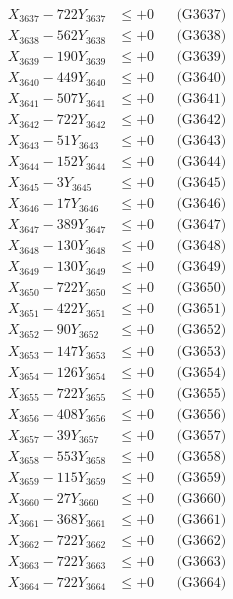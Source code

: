 \documentclass[a4paper,10pt]{article}
\begin{document}
{\begin{align}
X_{3637} - 722Y_{3637} &\leq +0 && \text{(G3637)} \\
X_{3638} - 562Y_{3638} &\leq +0 && \text{(G3638)} \\
X_{3639} - 190Y_{3639} &\leq +0 && \text{(G3639)} \\
X_{3640} - 449Y_{3640} &\leq +0 && \text{(G3640)} \\
\allowbreak
X_{3641} - 507Y_{3641} &\leq +0 && \text{(G3641)} \\
X_{3642} - 722Y_{3642} &\leq +0 && \text{(G3642)} \\
X_{3643} - 51Y_{3643} &\leq +0 && \text{(G3643)} \\
X_{3644} - 152Y_{3644} &\leq +0 && \text{(G3644)} \\
X_{3645} - 3Y_{3645} &\leq +0 && \text{(G3645)} \\
X_{3646} - 17Y_{3646} &\leq +0 && \text{(G3646)} \\
X_{3647} - 389Y_{3647} &\leq +0 && \text{(G3647)} \\
X_{3648} - 130Y_{3648} &\leq +0 && \text{(G3648)} \\
X_{3649} - 130Y_{3649} &\leq +0 && \text{(G3649)} \\
X_{3650} - 722Y_{3650} &\leq +0 && \text{(G3650)} \\
\allowbreak
X_{3651} - 422Y_{3651} &\leq +0 && \text{(G3651)} \\
X_{3652} - 90Y_{3652} &\leq +0 && \text{(G3652)} \\
X_{3653} - 147Y_{3653} &\leq +0 && \text{(G3653)} \\
X_{3654} - 126Y_{3654} &\leq +0 && \text{(G3654)} \\
X_{3655} - 722Y_{3655} &\leq +0 && \text{(G3655)} \\
X_{3656} - 408Y_{3656} &\leq +0 && \text{(G3656)} \\
X_{3657} - 39Y_{3657} &\leq +0 && \text{(G3657)} \\
X_{3658} - 553Y_{3658} &\leq +0 && \text{(G3658)} \\
X_{3659} - 115Y_{3659} &\leq +0 && \text{(G3659)} \\
X_{3660} - 27Y_{3660} &\leq +0 && \text{(G3660)} \\
\allowbreak
X_{3661} - 368Y_{3661} &\leq +0 && \text{(G3661)} \\
X_{3662} - 722Y_{3662} &\leq +0 && \text{(G3662)} \\
X_{3663} - 722Y_{3663} &\leq +0 && \text{(G3663)} \\
X_{3664} - 722Y_{3664} &\leq +0 && \text{(G3664)} \\

\end{align}}
\end{document}
